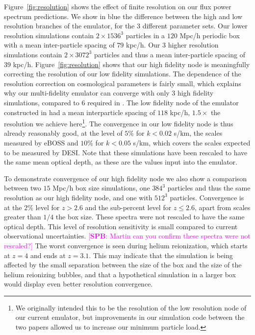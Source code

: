\documentclass[a4paper,11pt]{article}
\newcommand{\spb}[1]{{\textcolor{magenta}{[{\bf SPB}: #1]}}}
\begin{document}
Figure~\ref{fig:resolution} shows the effect of finite resolution on our flux power spectrum predictions. We show in blue the difference between the high and low resolution branches of the emulator, for the $3$ different parameter sets. Our lower resolution simulations contain $2\times 1536^3$ particles in a $120$ Mpc/h periodic box with a mean inter-particle spacing of $79$ kpc/h. Our $3$ higher resolution simulations contain $2\times 3072^3$ particles and thus a mean inter-particle spacing of $39$ kpc/h. Figure~\ref{fig:resolution} shows that our high fidelity node is meaningfully correcting the resolution of our low fidelity simulations. The dependence of the resolution correction on cosmological parameters is fairly small, which explains why our multi-fidelity emulator can converge with only $3$ high fidelity simulations, compared to $6$ required in \cite{Fernandez:2022}. The low fidelity node of the emulator constructed in \cite{Fernandez:2022} had a mean interparticle spacing of $118$ kpc/h, $1.5 \times$ the resolution we achieve here\footnote{We originally intended this to be the resolution of the low resolution node of our current emulator, but improvements in our simulation code between the two papers allowed us to increase our minimum particle load.}. The convergence in our low fidelity node is thus already reasonably good, at the level of $5\%$ for $k < 0.02$ s/km, the scales measured by eBOSS and $10\%$ for $k < 0.05$ s/km, which covers the scales expected to be measured by DESI. Note that these simulations have been rescaled to have the same mean optical depth, as these are the values input into the emulator.

To demonstrate convergence of our high fidelity node we also show a comparison between two $15$ Mpc/h box size simulations, one $384^3$ particles and thus the same resolution as our high fidelity node, and one with $512^3$ particles. Convergence is at the $2\%$ level for $z > 2.6$ and the sub-percent level for $z \leq 2.6$, apart from scales greater than $1/4$ the box size. These spectra were not rescaled to have the same optical depth. This level of resolution sensitivity is small compared to current observational uncertainties.
\spb{Martin can you confirm these spectra were not rescaled?}
The worst convergence is seen during helium reionization, which starts at $z=4$ and ends at $z=3.1$. This may indicate that the simulation is being affected by the small separation between the size of the box and the size of the helium reionizing bubbles, and that a hypothetical simulation in a larger box would display even better resolution convergence.
\end{document}
